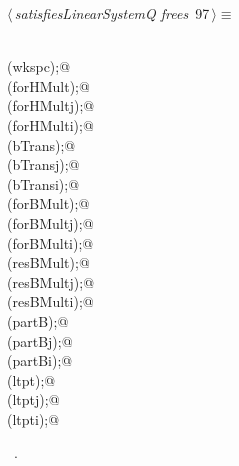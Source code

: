 \documentclass{article}
\begin{document}
\begin{flushleft} \small
\begin{minipage}{\linewidth}\label{scrap180}\raggedright\small
{} $\langle\,${\itshape satisfiesLinearSystemQ frees}\nobreak\ {\footnotesize {97}}$\,\rangle\equiv$
\vspace{-1ex}
\begin{list}{}{} \item
\mbox{}\verb@@\\
\mbox{}\verb@free(wkspc);@\\
\mbox{}\verb@free(forHMult);@\\
\mbox{}\verb@free(forHMultj);@\\
\mbox{}\verb@free(forHMulti);@\\
\mbox{}\verb@free(bTrans);@\\
\mbox{}\verb@free(bTransj);@\\
\mbox{}\verb@free(bTransi);@\\
\mbox{}\verb@free(forBMult);@\\
\mbox{}\verb@free(forBMultj);@\\
\mbox{}\verb@free(forBMulti);@\\
\mbox{}\verb@free(resBMult);@\\
\mbox{}\verb@free(resBMultj);@\\
\mbox{}\verb@free(resBMulti);@\\
\mbox{}\verb@free(partB);@\\
\mbox{}\verb@free(partBj);@\\
\mbox{}\verb@free(partBi);@\\
\mbox{}\verb@free(ltpt);@\\
\mbox{}\verb@free(ltptj);@\\
\mbox{}\verb@free(ltpti);@\\
\mbox{}\verb@@{\NWsep}
\end{list}
\vspace{-1.5ex}
\footnotesize
\begin{list}{}{\setlength{\itemsep}{-\parsep}\setlength{\itemindent}{-\leftmargin}}
\item \NWtxtMacroRefIn\ .

\item{}
\end{list}
\end{minipage}\vspace{4ex}
\end{flushleft}
\end{document}
